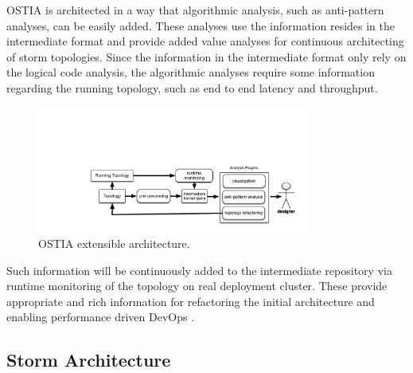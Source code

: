 OSTIA is architected in a way that algorithmic analysis, such as anti-pattern
analyses, can be easily added. These analyses use the information resides in the
intermediate format and provide added value analyses for continuous architecting
of storm topologies. Since the information in the intermediate format only rely
on the logical code analysis, the algorithmic analyses require some
information regarding the running topology, such as end to end latency and
throughput.

\begin{figure}[H]
	\begin{center}
		\includegraphics[width=9cm]{images/ostia-arch}
		\caption{OSTIA extensible architecture.}\label{archostia}
	\end{center}
\end{figure}

Such information will be continuously added to the intermediate repository via
runtime monitoring of the topology on real deployment cluster. These provide
appropriate and rich information for refactoring the initial architecture and
enabling performance driven DevOps \cite{brunnert2015performance}.

\subsection{Storm Architecture}

